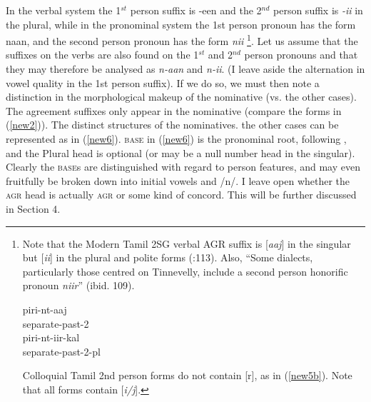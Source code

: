 \documentclass[output=paper,colorlinks,citecolor=brown,
]{langscibook}
\begin{document}
In the verbal system the 1$^{st}$ person suffix is -een and the 2$^{nd}$ person suffix is \textit{-ii} in the plural, while in the pronominal system the 1st person pronoun has the form naan, and the second person pronoun has the form \textit{nii} \footnote{Note that the Modern Tamil 2SG verbal AGR suffix is [\textit{aaj}] in the singular but [\textit{ii}] in the plural and polite forms (\citealt{steever2019dravidian}:113). Also, “Some dialects, particularly those centred on Tinnevelly, include a second person honorific pronoun \textit{niir}” (ibid. 109).


\begin{exe}
\ex \label{newfootnote1}
\begin{xlist}
\ex \label{newfootnote1a}
\gll piri-nt-aaj \\
separate-past-2 \\

\ex \label{newfootnote1b}
\gll piri-nt-iir-kal \\ 
separate-past-2-pl \\
\end{xlist}
\end{exe}


Colloquial Tamil 2nd person forms do not contain [r], as in (\ref{new5b}). Note that all forms contain [\textit{i/j}].
}.   Let us assume that the suffixes on the verbs are also found on the 1$^{st}$ and 2$^{nd}$ person pronouns and that they may therefore be analysed as          \textit{n-aan} and \textit{n-ii}. (I leave aside the alternation in vowel quality in the 1st person suffix). If we do so, we must then note a distinction in the morphological makeup of the nominative (vs. the other cases). The agreement suffixes only appear in the nominative (compare the forms in (\ref{new2})). The distinct structures of the nominatives. the other cases can be represented as in (\ref{new6}). \textsc{base} in (\ref{new6}) is the pronominal root, following \citet{SmithBobaljik2019}, and the Plural head is optional (or may be a null number head in the singular). Clearly the \textsc{base}s are distinguished with regard to person features, and may even fruitfully be broken down into initial vowels and /n/. I leave open whether the \textsc{agr} head is actually \textsc{agr} or some kind of concord. This will be further discussed in Section 4.
\end{document}
